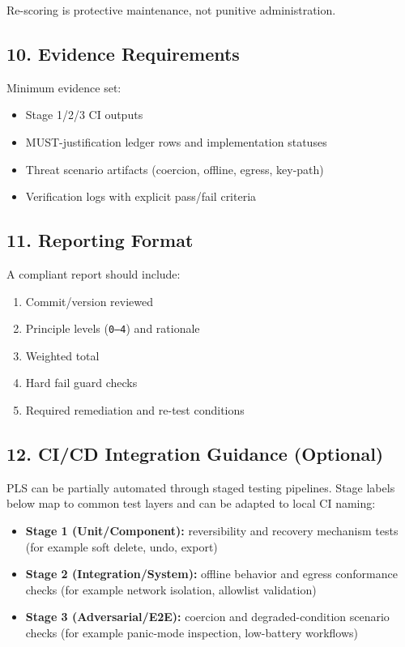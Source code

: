\documentclass[
]{article}
\providecommand{\tightlist}{%
  \setlength{\itemsep}{0pt}\setlength{\parskip}{0pt}}
\begin{document}
Re-scoring is protective maintenance, not punitive administration.

\subsection{10. Evidence Requirements}\label{10-evidence-requirements}

Minimum evidence set:

\begin{itemize}
\tightlist
\item
  Stage 1/2/3 CI outputs
\item
  MUST-justification ledger rows and implementation statuses
\item
  Threat scenario artifacts (coercion, offline, egress, key-path)
\item
  Verification logs with explicit pass/fail criteria
\end{itemize}

\subsection{11. Reporting Format}\label{11-reporting-format}

A compliant report should include:

\begin{enumerate}
\def\labelenumi{\arabic{enumi}.}
\tightlist
\item
  Commit/version reviewed
\item
  Principle levels (\texttt{0–4}) and rationale
\item
  Weighted total
\item
  Hard fail guard checks
\item
  Required remediation and re-test conditions
\end{enumerate}

\subsection{12. CI/CD Integration Guidance
(Optional)}\label{12-cicd-integration-guidance-optional}

PLS can be partially automated through staged testing pipelines. Stage
labels below map to common test layers and can be adapted to local CI
naming:

\begin{itemize}
\tightlist
\item
  \textbf{Stage 1 (Unit/Component):} reversibility and recovery
  mechanism tests (for example soft delete, undo, export)
\item
  \textbf{Stage 2 (Integration/System):} offline behavior and egress
  conformance checks (for example network isolation, allowlist
  validation)
\item
  \textbf{Stage 3 (Adversarial/E2E):} coercion and degraded-condition
  scenario checks (for example panic-mode inspection, low-battery
  workflows)
\end{itemize}
\end{document}
